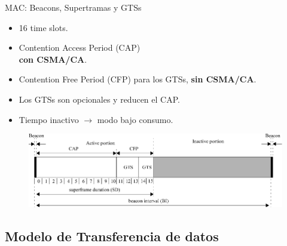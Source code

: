 \documentclass[aspectratio=169, handout]{beamer}
\begin{document}
\begin{frame}[t]{MAC: Beacons, Supertramas y GTSs}
\begin{minipage}[c]{1.0\linewidth}
\begin{minipage}[c]{0.35\linewidth}
		\begin{itemize}
			\item 16 time slots.
			\vspace{5px}
			\item Contention Access Period (CAP)\\ \textbf{con CSMA/CA}.
			\vspace{5px}
			\item Contention Free Period (CFP) para los GTSs, \textbf{sin CSMA/CA}.
			\vspace{5px}
			\item Los GTSs son opcionales y reducen el CAP.
			\vspace{5px}
			\item Tiempo inactivo $\rightarrow$ modo bajo consumo.
		\end{itemize}	
	\end{minipage}
	\begin{minipage}[c]{0.65\linewidth}
		\begin{figure}[H]
			\includegraphics[width=1\linewidth]{./imagenes/superFrame}\\
		\end{figure}	  	  	
	\end{minipage}
\end{minipage}

\end{frame}

\subsection[Transferencia de datos]{Modelo de Transferencia de datos}
\end{document}
